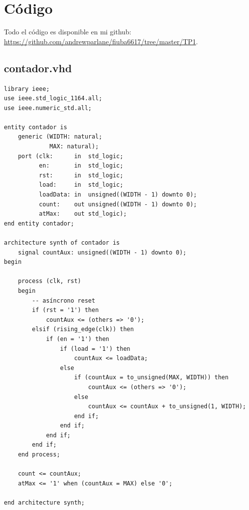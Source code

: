 \documentclass[a4paper]{article}
\begin{document}
\pagebreak
\section{Código}

Todo el código es disponible en mi github: \url{https://github.com/andrewparlane/fiuba6617/tree/master/TP1}.

\subsection{contador.vhd}
\begin{verbatim}
library ieee;
use ieee.std_logic_1164.all;
use ieee.numeric_std.all;

entity contador is
    generic (WIDTH: natural;
             MAX: natural);
    port (clk:      in  std_logic;
          en:       in  std_logic;
          rst:      in  std_logic;
          load:     in  std_logic;
          loadData: in  unsigned((WIDTH - 1) downto 0);
          count:    out unsigned((WIDTH - 1) downto 0);
          atMax:    out std_logic);
end entity contador;

architecture synth of contador is
    signal countAux: unsigned((WIDTH - 1) downto 0);
begin

    process (clk, rst)
    begin
        -- asíncrono reset
        if (rst = '1') then
            countAux <= (others => '0');
        elsif (rising_edge(clk)) then
            if (en = '1') then
                if (load = '1') then
                    countAux <= loadData;
                else
                    if (countAux = to_unsigned(MAX, WIDTH)) then
                        countAux <= (others => '0');
                    else
                        countAux <= countAux + to_unsigned(1, WIDTH);
                    end if;
                end if;
            end if;
        end if;
    end process;

    count <= countAux;
    atMax <= '1' when (countAux = MAX) else '0';

end architecture synth;
\end{verbatim}
\end{document}
